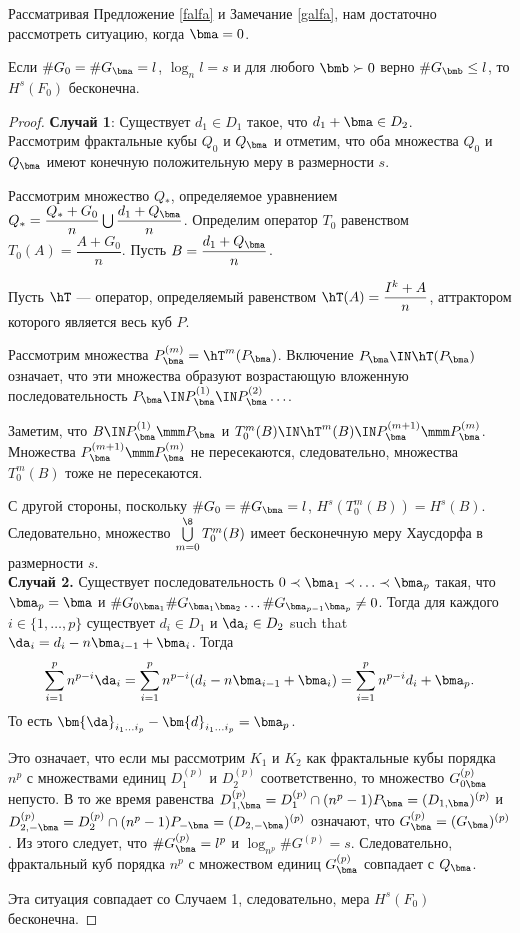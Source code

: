 Рассматривая Предложение \ref{falfa} и Замечание \ref{galfa}, нам достаточно рассмотреть ситуацию, когда $\bma=0$.


\begin{lemma}
Если $\#G_0=\#G_\bma=l$, $\log_nl=s$ и для любого $\bmb\succ 0$ верно $\#G_\bmb\le l$, то $H^s(F_0)$ бесконечна.
\end{lemma}

\begin{proof} 
{\bf Случай 1}: Существует $d_1\in D_1$ такое, что $d_1+\bma\in D_2$.\\

Рассмотрим фрактальные кубы $Q_0$ и $Q_\bma$ и отметим, что оба множества $Q_0$ и $Q_\bma$ имеют конечную положительную меру в размерности $s$.

Рассмотрим множество $Q_*$, определяемое уравнением \\
$Q_*= \dfrac{Q_*+G_0}n\bigcup\dfrac{d_1+Q_\bma}n$.
Определим оператор $T_0$ равенством $T_0(A)= \dfrac{A+G_0}n$. 
Пусть $B=\dfrac{d_1+Q_\bma}n$.
 
Пусть $\hT$ --- оператор, определяемый равенством $\hT(A)= \dfrac {I^k+A}n$, аттрактором которого является весь куб $P$.

Рассмотрим множества $P_\bma^{(m)}=\hT^m(P_\bma)$.
Включение $P_\bma\IN\hT(P_\bma)$ означает, что эти множества образуют возрастающую вложенную последовательность $P_\bma\IN P_\bma^{(1)}\IN P_\bma^{(2)}\ldots$.

Заметим, что $B\IN P_\bma^{(1)}\mmm P_\bma$ и $T_0^m(B)\IN \hT^m(B)\IN P_\bma^{(m+1)}\mmm P_\bma^{(m)}$.
Множества $P_\bma^{(m+1)}\mmm P_\bma^{(m)}$ не пересекаются, следовательно, множества $T_0^m(B)$ тоже не пересекаются.

С другой стороны, поскольку $\#G_0=\#G_\bma=l$, $H^ s(T_0^m(B))=H^s(B)$.
Следовательно, множество $\bigcup\limits_{m=0}^\8 T_0^m(B)$ имеет бесконечную меру Хаусдорфа в размерности $s$.\\
 
{\bf Случай 2.}   
Существует последовательность $0\prec\bma_1\prec\ldots\prec\bma_{p}$ такая, что $\bma_p=\bma$ и $\#G_{0\bma_1}\#G_{\bma_1\bma_2}\ldots\#G_{\bma_{p-1}\bma_p}\neq 0$.
Тогда для каждого $i\in\{1,\ldots,p\}$ существует $d_i\in D_1$ и  $\da_i\in D_2$ such that $\da_i=d_i-n\bma_{i-1}+\bma_i$.
Тогда \[\sum\limits_{i=1}^p n^{p-i}\da_i=\sum\limits_{i=1}^p n^{p-i}(d_i-n\bma_{i-1}+\bma_i)=\sum\limits_{i=1}^p n^{p-i} d_i +\bma_p.\] 
То есть $\bm{\da}_{i_1\ldots i_p}-\bm{d}_{i_1\ldots  i_p}=\bma_p$.
 
Это означает, что если мы рассмотрим $K_1$ и $K_2$ как фрактальные кубы порядка $n^p$ с множествами единиц $D_1^ {(p)}$ и $D_2^{(p)}$ соответственно, то множество $G^{(p)}_{0\bma}$ непусто.
В то же время равенства $D^{(p)}_{1,\bma}= D^{(p)}_1\cap(n^p-1)P_\bma=(D_{1,\bma})^{(p)}$ и $D^{(p)}_{2,-\bma}= D^{(p)}_2\cap(n^p-1)P_{-\bma}=(D_{2,-\bma})^{(p)}$ означают, что  $G^{(p)}_\bma=(G_\bma)^{(p)}$. 
Из этого следует, что $\#G^{(p)}_\bma=l^p$ и $\log_{n^p}\#G^{(p)}=s$.
Следовательно, фрактальный куб порядка $n^p$ с множеством единиц $G^{(p)}_\bma$ совпадает с $Q_\bma$.
  
Эта ситуация совпадает со Случаем 1, следовательно, мера $H^s(F_0)$ бесконечна.
\end{proof}

